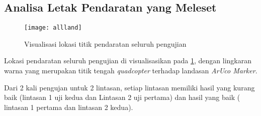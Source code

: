 \subsection{Analisa Letak Pendaratan yang Meleset}

\begin{figure}[H]
	\centering
	\texttt{[image: allland]}
	\caption{Visualisasi lokasi titik pendaratan seluruh pengujian}
	\label{fig:allland}
\end{figure}

Lokasi pendaratan seluruh pengujian di visualisasikan pada \cref{fig:allland}, dengan lingkaran warna yang merupakan titik tengah \textit{quadcopter} terhadap landasan \textit{ArUco Marker}.
 
Dari 2 kali pengujan untuk 2 lintasan, setiap lintasan memiliki hasil yang kurang baik (lintasan 1 uji kedua dan Lintasan 2 uji pertama) dan hasil yang baik ( lintasan 1 pertama dan lintasan 2 kedua). 

